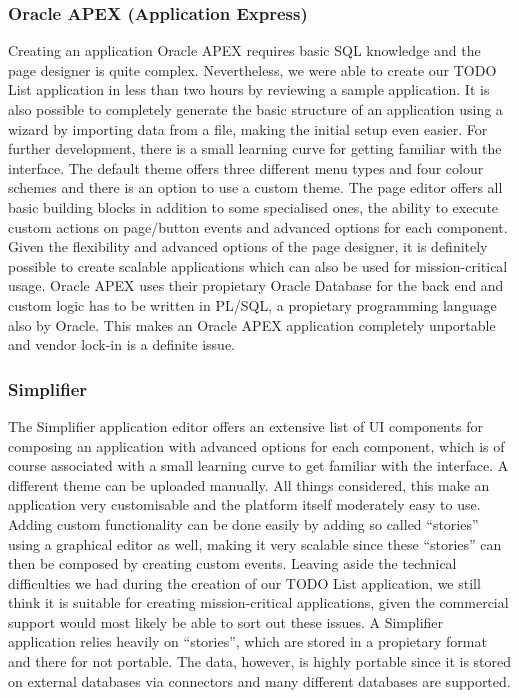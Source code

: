 \documentclass[runningheads]{llncs}
\begin{document}
\subsubsection{Oracle APEX (Application Express)}

Creating an application Oracle APEX requires basic SQL knowledge and the page designer is quite complex. Nevertheless, we were able to create our TODO List application in less than two hours by reviewing a sample application. It is also possible to completely generate the basic structure of an application using a wizard by importing data from a file, making the initial setup even easier. For further development, there is a small learning curve for getting familiar with the interface. The default theme offers three different menu types and four colour schemes and there is an option to use a custom theme. The page editor offers all basic building blocks in addition to some specialised ones, the ability to execute custom actions on page/button events and advanced options for each component. Given the flexibility and advanced options of the page designer, it is definitely possible to create scalable applications which can also be used for mission-critical usage. Oracle APEX uses their propietary Oracle Database for the back end and custom logic has to be written in PL/SQL, a propietary programming language also by Oracle. This makes an Oracle APEX application completely unportable and vendor lock-in is a definite issue.

\subsubsection{Simplifier}

The Simplifier application editor offers an extensive list of UI components for composing an application with advanced options for each component, which is of course associated with a small learning curve to get familiar with the interface. A different theme can be uploaded manually. All things considered, this make an application very customisable and the platform itself moderately easy to use. Adding custom functionality can be done easily by adding so called “stories” using a graphical editor as well, making it very scalable since these “stories” can then be composed by creating custom events. Leaving aside the technical difficulties we had during the creation of our TODO List application, we still think it is suitable for creating mission-critical applications, given the commercial support would most likely be able to sort out these issues. A Simplifier application relies heavily on “stories”, which are stored in a propietary format and there for not portable. The data, however, is highly portable since it is stored on external databases via connectors and many different databases are supported.
\end{document}
